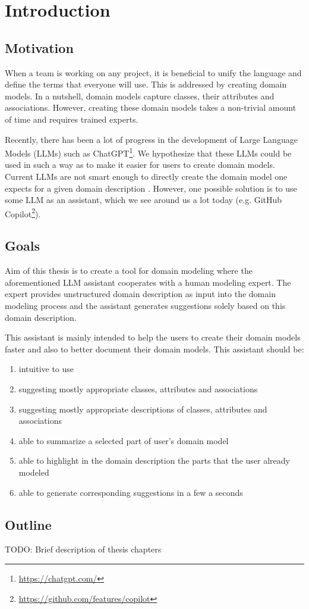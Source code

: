 \chapter*{Introduction}


\section*{Motivation}
When a team is working on any project, it is beneficial to unify the language and define the terms that everyone will use. This is addressed by creating domain models. In a nutshell, domain models capture classes, their attributes and associations. However, creating these domain models takes a non-trivial amount of time and requires trained experts.

Recently, there has been a lot of progress in the development of Large Language Models (LLMs) \cite{Zhao2023} such as ChatGPT\footnote{\url{https://chatgpt.com/}}. We hypothesize that these LLMs could be used in such a way as to make it easier for users to create domain models. Current LLMs are not smart enough to directly create the domain model one expects for a given domain description \cite{Chen2023}. However, one possible solution is to use some LLM as an assistant, which we see around us a lot today (e.g. GitHub Copilot\footnote{\url{https://github.com/features/copilot}}).



\section*{Goals}
Aim of this thesis is to create a tool for domain modeling where the aforementioned LLM assistant cooperates with a human modeling expert. The expert provides unstructured domain description as input into the domain modeling process and the assistant generates suggestions solely based on this domain description.

This assistant is mainly intended to help the users to create their domain models faster and also to better document their domain models. This assistant should be:
\begin{enumerate}
\item intuitive to use
\item suggesting mostly appropriate classes, attributes and associations
\item suggesting mostly appropriate descriptions of classes, attributes and associations
\item able to summarize a selected part of user's domain model
\item able to highlight in the domain description the parts that the user already modeled
\item able to generate corresponding suggestions in a few a seconds
\end{enumerate}


\section*{Outline}
TODO: Brief description of thesis chapters